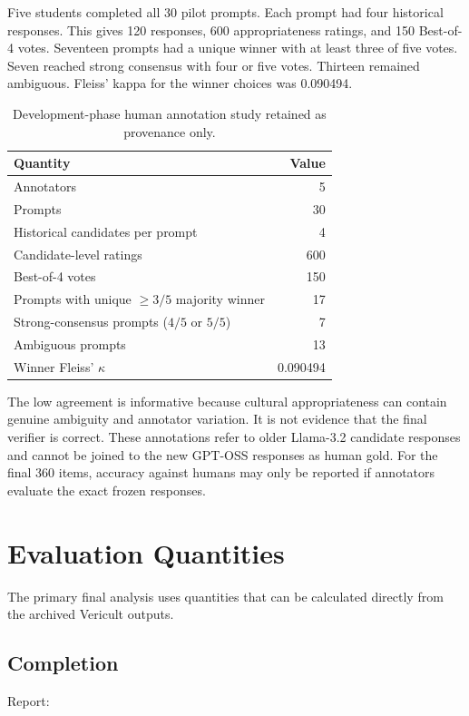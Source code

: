 Five students completed all 30 pilot prompts. Each prompt had four historical responses. This gives 120 responses, 600 appropriateness ratings, and 150 Best-of-4 votes. Seventeen prompts had a unique winner with at least three of five votes. Seven reached strong consensus with four or five votes. Thirteen remained ambiguous. Fleiss' kappa for the winner choices was 0.090494.

\begin{table}[ht]
\centering
\caption{Development-phase human annotation study retained as provenance only.}
\label{tab:pilot-human}
\begin{tabular}{l r}
\toprule
Quantity & Value \\
\midrule
Annotators & 5 \\
Prompts & 30 \\
Historical candidates per prompt & 4 \\
Candidate-level ratings & 600 \\
Best-of-4 votes & 150 \\
Prompts with unique $\geq 3/5$ majority winner & 17 \\
Strong-consensus prompts ($4/5$ or $5/5$) & 7 \\
Ambiguous prompts & 13 \\
Winner Fleiss' $\kappa$ & 0.090494 \\
\bottomrule
\end{tabular}
\end{table}

The low agreement is informative because cultural appropriateness can contain genuine ambiguity and annotator variation. It is not evidence that the final verifier is correct. These annotations refer to older Llama-3.2 candidate responses and cannot be joined to the new GPT-OSS responses as human gold. For the final 360 items, accuracy against humans may only be reported if annotators evaluate the exact frozen responses.
\section{Evaluation Quantities}

The primary final analysis uses quantities that can be calculated directly from the archived Vericult outputs.

\subsection{Completion}

Report:

